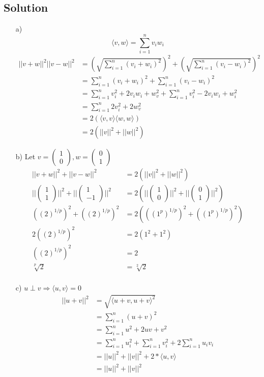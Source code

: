 \documentclass[10pt]{article}
\numberwithin{equation}{section}
\newcommand{\unita}{\begin{pmatrix} 1\\0\end{pmatrix}}
\newcommand{\unitb}{\begin{pmatrix} 0\\1\end{pmatrix}}
\begin{document}
\subsection*{Solution}
\begin{enumerate}
\item[a)]{
$$\langle v, w \rangle = \sum_{i=1}^n v_i w_i$$
    \begin{align*}
      ||v + w||^2 ||v - w||^2 &= \left(\sqrt{\sum_{i=1}^n (v_i + w_i)^2}\right)^2 + \left(\sqrt{\sum_{i=1}^n (v_i - w_i)^2}\right)^2\\
      &= \sum_{i=1}^n (v_i + w_i)^2+ \sum_{i=1}^n (v_i - w_i)^2\\
      &= \sum_{i=1}^n v_i^2 +2v_i w_i + w_v^2 + \sum_{i=1}^n v_i^2 -2v_i w_i  + w_i^2\\
      &= \sum_{i=1}^n 2v_i^2 + 2w_v^2 \\
      &= 2 (\langle v,v \rangle \langle w,w \rangle)\\
      &= 2 (||v||^2 + ||w||^2)
    \end{align*}
  }
\item[b)]{
    Let $v = \unita, w = \unitb$
    \begin{align*}
      || v+w||^2  + || v-w||^2 &= 2(||v||^2 +||w||^2)\\
      || \begin{pmatrix}1\\1\end{pmatrix}||^2  + || \begin{pmatrix}1\\-1\end{pmatrix}||^2 &= 2\left(||\unita||^2 +||\unitb||^2\right)\\
      ((2)^{1/p})^2 + ((2)^{1/p})^2 &= 2\left( ((1^p)^{1/p})^2 + ((1^p)^{1/p})^2\right)\\
      2((2)^{1/p})^2 &= 2( 1^2 + 1^2)\\
      ((2)^{1/p})^2 &= 2\\
      \sqrt[p]{2} &= \sqrt[2]{2}\\
    \end{align*}
  }
\item[c)]{
    $u \perp v \Rightarrow \langle u,v \rangle = 0$
    \begin{align*}
      || u + v ||^2 &= \sqrt{\langle u+v, u+v\rangle^2 }\\
                    &= \sum_{i=1}^n (u+v)^2\\
                    &= \sum_{i=1}^n u^2 + 2uv + v^2\\
                    &= \sum_{i=1}^n u_i^2 + \sum_{i=1}^n v_i^2 + 2\sum_{i=1}^n u_i v_i\\
                    &= ||u||^2 + ||v||^2 + 2*\langle u,v \rangle\\
                    &= ||u||^2 + ||v||^2 
    \end{align*}
  }
\end{enumerate}
\end{document}
